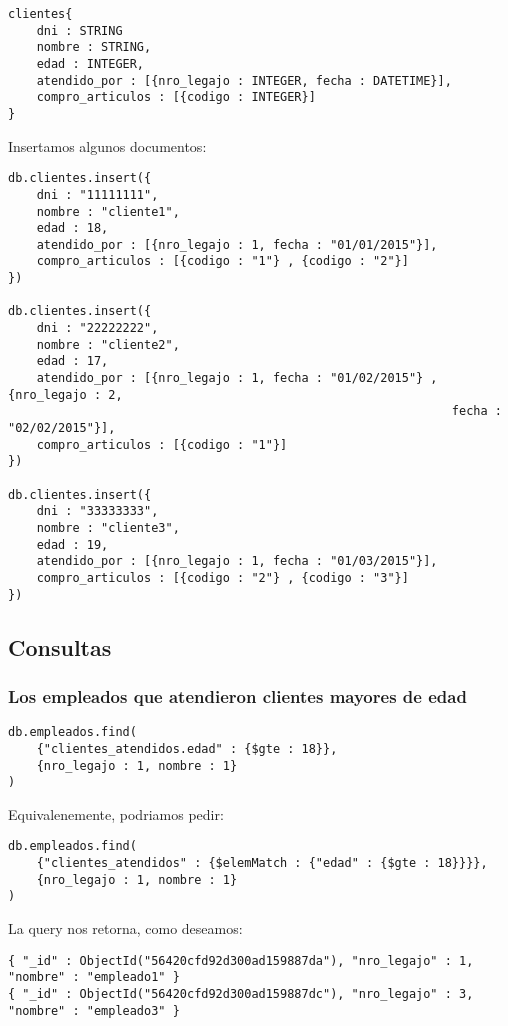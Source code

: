 \begin{verbatim}
clientes{
    dni : STRING
    nombre : STRING,
    edad : INTEGER,
    atendido_por : [{nro_legajo : INTEGER, fecha : DATETIME}],
    compro_articulos : [{codigo : INTEGER}]
}
\end{verbatim}

Insertamos algunos documentos:

\begin{verbatim}
db.clientes.insert({
    dni : "11111111",
    nombre : "cliente1",
    edad : 18,
    atendido_por : [{nro_legajo : 1, fecha : "01/01/2015"}],
    compro_articulos : [{codigo : "1"} , {codigo : "2"}]
})

db.clientes.insert({
    dni : "22222222",
    nombre : "cliente2",
    edad : 17,
    atendido_por : [{nro_legajo : 1, fecha : "01/02/2015"} , {nro_legajo : 2, 
                                                              fecha : "02/02/2015"}],
    compro_articulos : [{codigo : "1"}]
})

db.clientes.insert({
    dni : "33333333",
    nombre : "cliente3",
    edad : 19,
    atendido_por : [{nro_legajo : 1, fecha : "01/03/2015"}],
    compro_articulos : [{codigo : "2"} , {codigo : "3"}]
})
\end{verbatim}

\subsection{Consultas}

\subsubsection{Los empleados que atendieron clientes mayores de edad}

\begin{verbatim}
db.empleados.find(
    {"clientes_atendidos.edad" : {$gte : 18}},
    {nro_legajo : 1, nombre : 1}
)
\end{verbatim}

Equivalenemente, podriamos pedir:

\begin{verbatim}
db.empleados.find(
    {"clientes_atendidos" : {$elemMatch : {"edad" : {$gte : 18}}}},
    {nro_legajo : 1, nombre : 1}
)
\end{verbatim}

La query nos retorna, como deseamos:

\begin{verbatim}
{ "_id" : ObjectId("56420cfd92d300ad159887da"), "nro_legajo" : 1, "nombre" : "empleado1" }
{ "_id" : ObjectId("56420cfd92d300ad159887dc"), "nro_legajo" : 3, "nombre" : "empleado3" }
\end{verbatim}

